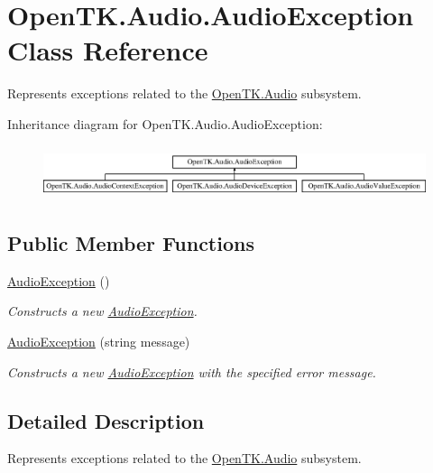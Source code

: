 \hypertarget{class_open_t_k_1_1_audio_1_1_audio_exception}{\section{Open\-T\-K.\-Audio.\-Audio\-Exception Class Reference}
\label{class_open_t_k_1_1_audio_1_1_audio_exception}
}


Represents exceptions related to the \hyperlink{namespace_open_t_k_1_1_audio}{Open\-T\-K.\-Audio} subsystem. 


Inheritance diagram for Open\-T\-K.\-Audio.\-Audio\-Exception\-:\begin{figure}[H]
\begin{center}
\leavevmode
\includegraphics[height=1.575246cm]{class_open_t_k_1_1_audio_1_1_audio_exception}
\end{center}
\end{figure}
\subsection*{Public Member Functions}
\begin{DoxyCompactItemize}
\item 
\hyperlink{class_open_t_k_1_1_audio_1_1_audio_exception_a99d7015c904d6a3804df20a59b9c9212}{Audio\-Exception} ()
\begin{DoxyCompactList}\small\item\em Constructs a new \hyperlink{class_open_t_k_1_1_audio_1_1_audio_exception}{Audio\-Exception}.\end{DoxyCompactList}\item 
\hyperlink{class_open_t_k_1_1_audio_1_1_audio_exception_addad14cecea438cb905aa57736dd24ee}{Audio\-Exception} (string message)
\begin{DoxyCompactList}\small\item\em Constructs a new \hyperlink{class_open_t_k_1_1_audio_1_1_audio_exception}{Audio\-Exception} with the specified error message.\end{DoxyCompactList}\end{DoxyCompactItemize}


\subsection{Detailed Description}
Represents exceptions related to the \hyperlink{namespace_open_t_k_1_1_audio}{Open\-T\-K.\-Audio} subsystem.



